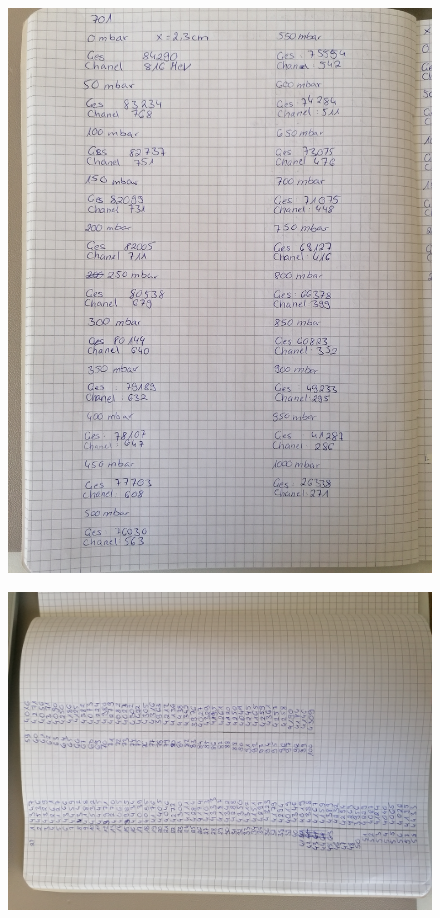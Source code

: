 \begin{figure}
\centering
\includegraphics[width=\textwidth]{content/Anhang 2.jpg}
\end{figure}

\begin{figure}
\centering
\includegraphics[width=\textwidth]{content/Anhang 3.jpg}
\end{figure}
